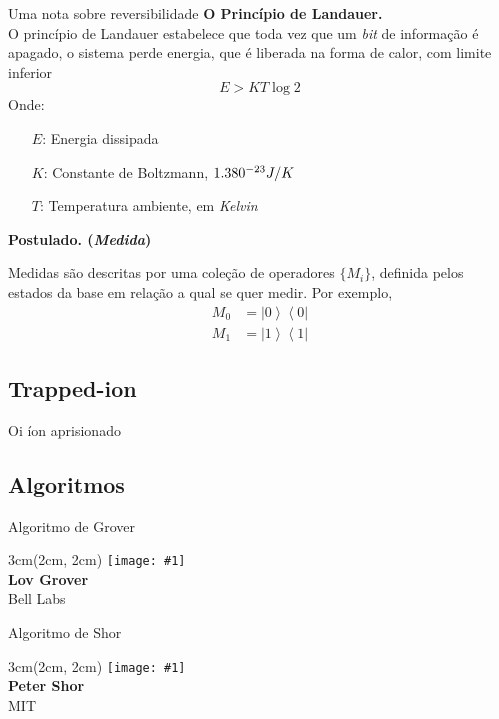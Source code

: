 \documentclass[t]{beamer}
\newcommand{\postulado}[1]{%
	\textbf{Postulado. (\emph{#1})\\}
}
\newcommand{\ketbra}[2]{\ensuremath{\left|#1\right\rangle\left\langle#2\right|}}
\newcommand{\person}[6]{%
\begin{textblock*}{#4}(#5, #6)
	\texttt{[image: \#1]}\\
	\textbf{#2}\\
	{\small #3}
\end{textblock*}
}
\begin{document}
	\begin{frame}{Uma nota sobre reversibilidade}	
		\textbf{O Princípio de Landauer.}\\
		O princípio de Landauer estabelece que toda vez que um \textit{bit} de informação é apagado, o sistema perde energia, que é liberada na forma de calor, com limite inferior
		$$E > K T \log 2$$
		Onde:
		\begin{itemize}
			\item[$E$:] Energia dissipada
			\item[$K$:] Constante de Boltzmann, $1.380 \time 10^{-23} J / K$
			\item[$T$:] Temperatura ambiente, em \textit{Kelvin}
		\end{itemize}
		
	\end{frame}	
	
	\begin{frame}{\subsecname}
		\postulado{Medida}		
		Medidas são descritas por uma coleção de operadores $\{M_i\}$, definida pelos estados da base em relação a qual se quer medir. Por exemplo,
		\begin{align*}
			M_0 &= \ketbra{0}{0}\\
			M_1 &= \ketbra{1}{1}
		\end{align*}				
		
	\end{frame}
	
	\subsection{Trapped-ion}
	\begin{frame}{\subsecname}
		Oi íon aprisionado
	\end{frame}

	\subsection{Algoritmos}
	
	\begin{frame}{Algoritmo de Grover}
	
	\person{grover.jpg}{Lov Grover}{Bell Labs}{3cm}{2cm}{2cm}
		
	\end{frame}

	\begin{frame}{Algoritmo de Shor}
	
	\person{shor.jpg}{Peter Shor}{MIT}{3cm}{2cm}{2cm}
			
	\end{frame}
	
\end{document}
